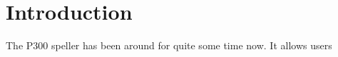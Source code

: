 \chapter{Introduction}
The P300 speller has been around for quite some time now. It allows users 








